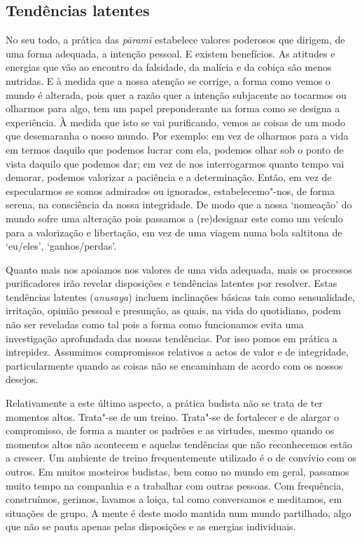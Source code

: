 \subsection{Tendências latentes}

No seu todo, a prática das \emph{pāramī} estabelece valores poderosos que
dirigem, de uma forma adequada, a intenção pessoal. E existem benefícios. As
atitudes e energias que vão ao encontro da falsidade, da malícia e da cobiça são
menos nutridas. E à medida que a nossa atenção se corrige, a forma como vemos o
mundo é alterada, pois quer a razão quer a intenção subjacente ao tocarmos ou
olharmos para algo, tem um papel preponderante na forma como se designa a
experiência. À medida que isto se vai purificando, vemos as coisas de um modo
que desemaranha o nosso mundo. Por exemplo: em vez de olharmos para a vida em
termos daquilo que podemos lucrar com ela, podemos olhar sob o ponto de vista
daquilo que podemos dar; em vez de nos interrogarmos quanto tempo vai demorar,
podemos valorizar a paciência e a determinação. Então, em vez de especularmos se
somos admirados ou ignorados, estabelecemo"-nos, de forma serena, na consciência
da nossa integridade. De modo que a nossa `nomeação' do mundo sofre uma
alteração pois passamos a (re)designar este como um veículo para a valorização e
libertação, em vez de uma viagem numa bola saltitona de `eu/eles',
`ganhos/perdas'.

Quanto mais nos apoiamos nos valores de uma vida adequada, mais os processos
purificadores irão revelar disposições e tendências latentes por resolver. Estas
tendências latentes (\emph{anusaya}) incluem inclinações básicas tais como
sensualidade, irritação, opinião pessoal e presunção, as quais, na vida do
quotidiano, podem não ser reveladas como tal pois a forma como funcionamos evita
uma investigação aprofundada das nossas tendências. Por isso pomos em prática a
intrepidez. Assumimos compromissos relativos a actos de valor e de integridade,
particularmente quando as coisas não se encaminham de acordo com os nossos
desejos.

Relativamente a este último aspecto, a prática budista não se trata de ter
momentos altos. Trata"-se de um treino. Trata"-se de fortalecer e de alargar o
compromisso, de forma a manter os padrões e as virtudes, mesmo quando os
momentos altos não acontecem e aquelas tendências que não reconhecemos estão a
crescer. Um ambiente de treino frequentemente utilizado é o de convívio com os
outros. Em muitos mosteiros budistas, bem como no mundo em geral, passamos muito
tempo na companhia e a trabalhar com outras pessoas. Com frequência,
construímos, gerimos, lavamos a loiça, tal como conversamos e meditamos, em
situações de grupo. A mente é deste modo mantida num mundo partilhado, algo que
não se pauta apenas pelas disposições e as energias individuais. 

